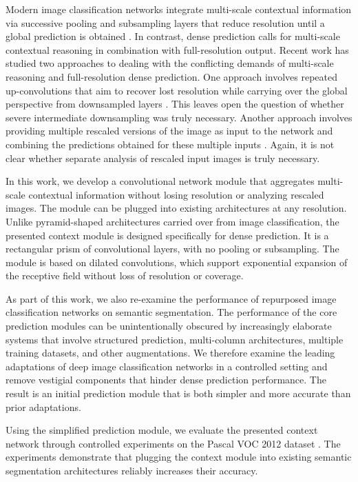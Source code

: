 \documentclass{article} %
\begin{document}
Modern image classification networks integrate multi-scale contextual information via successive pooling and subsampling layers that reduce resolution until a global prediction is obtained \citep{Krizhevsky2012,SimonyanZisserman2015}.
In contrast, dense prediction calls for multi-scale contextual reasoning in combination with full-resolution output. Recent work has studied two approaches to dealing with the conflicting demands of multi-scale reasoning and full-resolution dense prediction. One approach involves repeated up-convolutions that aim to recover lost resolution while carrying over the global perspective from downsampled layers \citep{Noh2015,Fischer2015}. This leaves open the question of whether severe intermediate downsampling was truly necessary. Another approach involves providing multiple rescaled versions of the image as input to the network and combining the predictions obtained for these multiple inputs \citep{Farabet2013,Lin2015,Chen2015Scale}. Again, it is not clear whether separate analysis of rescaled input images is truly necessary.

In this work, we develop a convolutional network module that aggregates multi-scale contextual information without losing resolution or analyzing rescaled images. The module can be plugged into existing architectures at any resolution. Unlike pyramid-shaped architectures carried over from image classification, the presented context module is designed specifically for dense prediction.
It is a rectangular prism of convolutional layers, with no pooling or subsampling. The module is based on dilated convolutions, which support exponential expansion of the receptive field without loss of resolution or coverage.

As part of this work, we also re-examine the performance of repurposed image classification networks on semantic segmentation. The performance of the core prediction modules can be unintentionally obscured by increasingly elaborate systems that involve structured prediction, multi-column architectures, multiple training datasets, and other augmentations. We therefore examine the leading adaptations of deep image classification networks in a controlled setting and remove vestigial components that hinder dense prediction performance. The result is an initial prediction module that is both simpler and more accurate than prior adaptations.

Using the simplified prediction module, we evaluate the presented context network through controlled experiments on the Pascal VOC 2012 dataset \citep{Everingham2010}. The experiments demonstrate that plugging the context module into existing semantic segmentation architectures reliably increases their accuracy.
\end{document}
